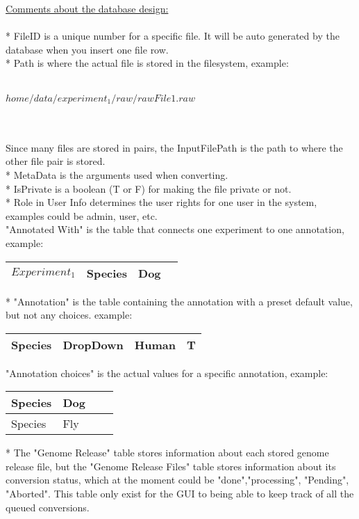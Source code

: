 \underline{Comments about the database design:}\\
\\
* FileID is a unique number for a specific file. It will be auto generated by the database when you insert one file row.\\
* Path is where the actual file is stored in the filesystem, example:\\
\\
\centerline{$home/data/experiment_1/raw/rawFile1.raw$}\\
\\
Since many files are stored in pairs, the InputFilePath is the path to where the other file pair  is stored.\\
* MetaData is the arguments used when converting. \\
* IsPrivate is a boolean (T or F) for making the file private or not.\\
* Role in User Info determines the user rights for one user in the system, examples could be admin, user, etc.\\
"Annotated With" is the table that connects one experiment to one annotation, example:
\begin{center}
  \begin{tabular}{| l | l | l | l|}
    \hline
    $Experiment_1$ & Species & Dog\\ \hline
  \end{tabular}
\end{center}
* "Annotation" is the table containing the annotation with a preset default value, but not any choices. example:
\begin{center}
  \begin{tabular}{| l | l | l | l|}
    \hline
    Species & DropDown & Human & T \\ \hline
  \end{tabular}
\end{center}
"Annotation choices" is the actual values for a specific annotation, example:\\
\begin{center}
  \begin{tabular}{| l | l | l | l|}
    \hline
    Species & Dog \\ \hline
    Species & Fly \\ \hline
  \end{tabular}
\end{center}
* The "Genome Release" table stores information about each stored genome release file, but the "Genome Release Files" table stores information about its conversion status, which at the moment could be "done","processing", "Pending", "Aborted". This table only exist for the GUI to being able to keep track of all the queued conversions.\\

